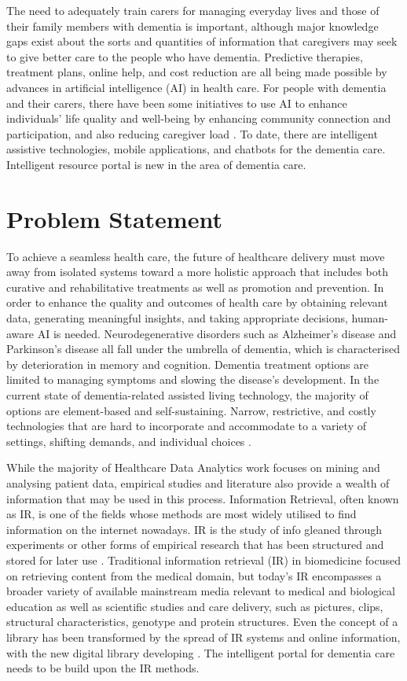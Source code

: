 The need to adequately train carers for managing everyday lives and those of their family members with dementia is important, although major knowledge gaps exist about the sorts and quantities of information that caregivers may seek to give better care to the people who have dementia. Predictive therapies, treatment plans, online help, and cost reduction are all being made possible by advances in artificial intelligence (AI) in health care. For people with dementia and their carers, there have been some initiatives to use AI to enhance individuals' life quality and well-being by enhancing community connection and participation, and also reducing caregiver load \citep{int2}. To date, there are intelligent assistive technologies, mobile applications, and chatbots for the dementia care. Intelligent resource portal is new in the area of dementia care.

\goodbreak

\section{Problem Statement}

To achieve a seamless health care, the future of healthcare delivery must move away from isolated systems toward a more holistic approach that includes both curative and rehabilitative treatments as well as promotion and prevention. In order to enhance the quality and outcomes of health care by obtaining relevant data, generating meaningful insights, and taking appropriate decisions, human-aware AI is needed. Neurodegenerative disorders such as Alzheimer's disease and Parkinson's disease all fall under the umbrella of dementia, which is characterised by deterioration in memory and cognition. Dementia treatment options are limited to managing symptoms and slowing the disease's development. In the current state of dementia-related assisted living technology, the majority of options are element-based and self-sustaining. Narrow, restrictive, and costly technologies that are hard to incorporate and accommodate to a variety of settings, shifting demands, and individual choices \citep{prob1}.

While the majority of Healthcare Data Analytics work focuses on mining and analysing patient data, empirical studies and literature also provide a wealth of information that may be used in this process. Information Retrieval, often known as IR, is one of the fields whose methods are most widely utilised to find information on the internet nowadays. IR is the study of info gleaned through experiments or other forms of empirical research that has been structured and stored for later use \citep{prob2}. Traditional information retrieval (IR) in biomedicine focused on retrieving content from the medical domain, but today's IR encompasses a broader variety of available mainstream media relevant to medical and biological education as well as scientific studies and care delivery, such as pictures, clips, structural characteristics, genotype and protein structures. Even the concept of a library has been transformed by the spread of IR systems and online information, with the new digital library developing \citep{prob3}. The intelligent portal for dementia care needs to be build upon the IR methods.

